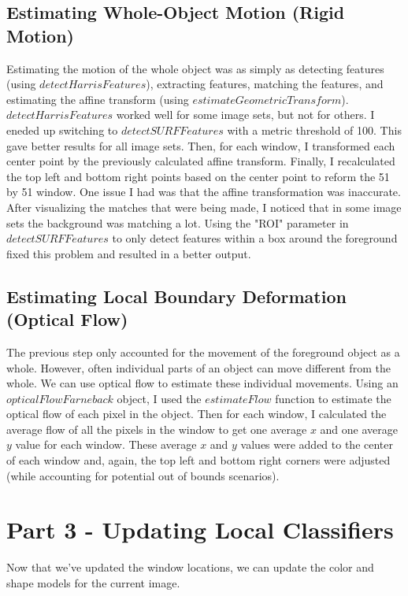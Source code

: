 \documentclass[10pt]{article}
\begin{document}
\subsection{Estimating Whole-Object Motion (Rigid Motion)}
Estimating the motion of the whole object was as simply as detecting features (using $detectHarrisFeatures$), extracting features, matching the features, and estimating the affine transform (using $estimateGeometricTransform$). $detectHarrisFeatures$ worked well for some image sets, but not for others. I eneded up switching to $detectSURFFeatures$ with a metric threshold of 100. This gave better results for all image sets. Then, for each window, I transformed each center point by the previously calculated affine transform. Finally, I recalculated the top left and bottom right points based on the center point to reform the 51 by 51 window. One issue I had was that the affine transformation was inaccurate. After visualizing the matches that were being made, I noticed that in some image sets the background was matching a lot. Using the "ROI" parameter in $detectSURFFeatures$ to only detect features within a box around the foreground fixed this problem and resulted in a better output.
\subsection{Estimating Local Boundary Deformation (Optical Flow)}
The previous step only accounted for the movement of the foreground object as a whole. However, often individual parts of an object can move different from the whole. We can use optical flow to estimate these individual movements. Using an $opticalFlowFarneback$ object, I used the $estimateFlow$ function to estimate the optical flow of each pixel in the object. Then for each window, I calculated the average flow of all the pixels in the window to get one average $x$ and one average $y$ value for each window. These average $x$ and $y$ values were added to the center of each window and, again, the top left and bottom right corners were adjusted (while accounting for potential out of bounds scenarios).

\section{Part 3 - Updating Local Classifiers}
Now that we've updated the window locations, we can update the color and shape models for the current image.
\end{document}
